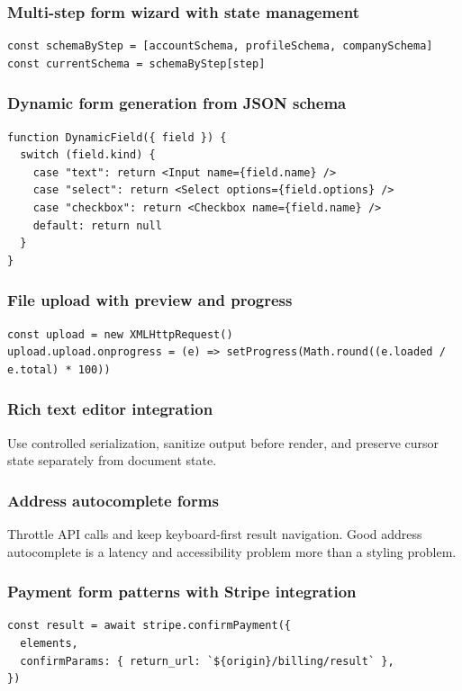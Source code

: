 \subsubsection{Multi-step form wizard with state management}
\begin{verbatim}
const schemaByStep = [accountSchema, profileSchema, companySchema]
const currentSchema = schemaByStep[step]
\end{verbatim}

\subsubsection{Dynamic form generation from JSON schema}
\begin{verbatim}
function DynamicField({ field }) {
  switch (field.kind) {
    case "text": return <Input name={field.name} />
    case "select": return <Select options={field.options} />
    case "checkbox": return <Checkbox name={field.name} />
    default: return null
  }
}
\end{verbatim}

\subsubsection{File upload with preview and progress}
\begin{verbatim}
const upload = new XMLHttpRequest()
upload.upload.onprogress = (e) => setProgress(Math.round((e.loaded / e.total) * 100))
\end{verbatim}

\subsubsection{Rich text editor integration}
Use controlled serialization, sanitize output before render, and preserve cursor state separately from document state.

\subsubsection{Address autocomplete forms}
Throttle API calls and keep keyboard-first result navigation. Good address autocomplete is a latency and accessibility problem more than a styling problem.

\subsubsection{Payment form patterns with Stripe integration}
\begin{verbatim}
const result = await stripe.confirmPayment({
  elements,
  confirmParams: { return_url: `${origin}/billing/result` },
})
\end{verbatim}

